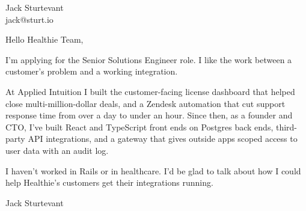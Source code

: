 \documentclass[11pt]{article}
\begin{document}
\raggedright

{\namefont\fontsize{20pt}{24pt}\selectfont Jack Sturtevant}\\[-0.3em]
jack@sturt.io

\vspace{1.2em}

Hello Healthie Team,

I'm applying for the Senior Solutions Engineer role. I like the work between a customer's problem and a working integration.

At Applied Intuition I built the customer-facing license dashboard that helped close multi-million-dollar deals, and a Zendesk automation that cut support response time from over a day to under an hour. Since then, as a founder and CTO, I've built React and TypeScript front ends on Postgres back ends, third-party API integrations, and a gateway that gives outside apps scoped access to user data with an audit log.

I haven't worked in Rails or in healthcare. I'd be glad to talk about how I could help Healthie's customers get their integrations running.

\vspace{0.6em}
Jack Sturtevant
\end{document}
